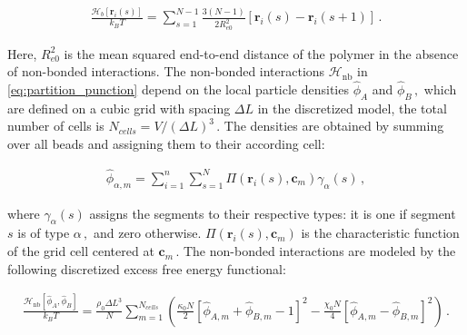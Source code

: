 \documentclass[bachelor,       %
               oneside,        %
               BCOR10mm,       %
               ngerman, english %
               ]{GAUBM}
\begin{document}
\begin{align}
    \frac{\mathcal H_b[\mathbf r_i(s)]}{k_BT}=\sum_{s=1}^{N-1}\frac{3(N-1)}{2R_{e0}^2}[\mathbf r_i(s)-\mathbf r_i(s+1)]\,.
\end{align}

Here, $R_{e0}^2$ is the mean squared end-to-end distance of the polymer in the absence of non-bonded interactions. The non-bonded interactions $\mathcal H_\text{nb}$ in \autoref{eq:partition_punction} depend on the local particle densities $\hat\phi_A$ and $\hat\phi_B\,,$ which are defined on a cubic grid with spacing $\Delta L$ in the discretized model, the total number of cells is $N_{cells}=V/(\Delta L)^3\,.$ The densities are obtained by summing over all beads and assigning them to their according cell:

\begin{align}
    \hat\phi_{\alpha,m}=\sum_{i=1}^n\sum_{s=1}^N\Pi(\mathbf r_i(s),\mathbf c_m)\gamma_\alpha(s)\,,
    \label{eq:normalized_densities}
\end{align}

where $\gamma_\alpha(s)$ assigns the segments to their respective types: it is one if segment $s$ is of type $\alpha\,,$ and zero otherwise. $\Pi(\mathbf r_i(s),\mathbf c_m)$ is the characteristic function of the grid cell centered at $\mathbf c_m\,.$ The non-bonded interactions are modeled by the following discretized excess free energy functional:

\begin{align}
    \frac{\mathcal H_\text{nb}[\hat\phi_A,\hat\phi_B]}{k_BT}=\frac{\rho_0\Delta L^3}{N}\sum_{m=1}^{N_{cells}}\left(\frac{\kappa_0 N}{2}[\hat\phi_{A,m}+\hat\phi_{B,m}-1]^2-\frac{\chi_0 N}{4}[\hat\phi_{A,m}-\hat\phi_{B,m}]^2\right)\,.
    \label{eq:nonbonded_discretized}
\end{align}
\end{document}
